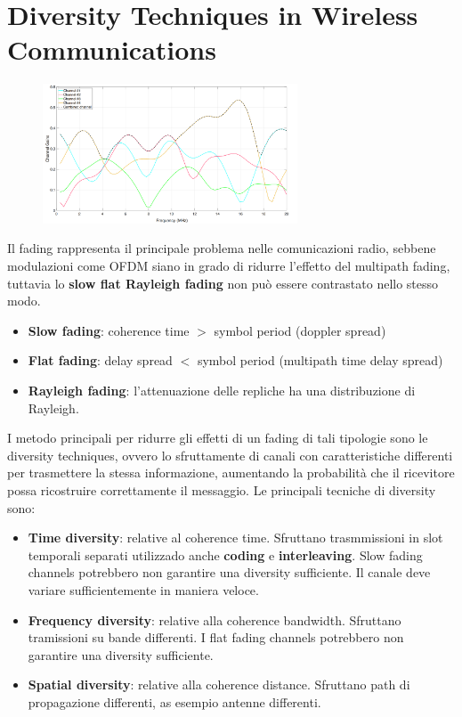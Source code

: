 \section*{Diversity Techniques in Wireless Communications}



\begin{figure}[ht]
    \centering
    \includegraphics[width=0.675\textwidth]{imgs/diversity_graph.jpg}
\end{figure}


Il fading rappresenta il principale problema nelle comunicazioni radio, sebbene modulazioni come OFDM siano in grado di ridurre l'effetto del multipath fading, tuttavia lo \textbf{slow flat Rayleigh fading} non può essere contrastato nello stesso modo.

\begin{itemize}
    \item \textbf{Slow fading}: coherence time $>$ symbol period (doppler spread)
    \item \textbf{Flat fading}: delay spread $<$ symbol period (multipath time delay spread)
    \item \textbf{Rayleigh fading}: l'attenuazione delle repliche ha una distribuzione di Rayleigh.
\end{itemize}

I metodo principali per ridurre gli effetti di un fading di tali tipologie sono le diversity techniques, ovvero lo sfruttamente di canali con caratteristiche differenti per trasmettere la stessa informazione, aumentando la probabilità che il ricevitore possa ricostruire correttamente il messaggio.
Le principali tecniche di diversity sono:
\begin{itemize}
    \item \textbf{Time diversity}: relative al coherence time. Sfruttano trasmmissioni in slot temporali separati utilizzado anche \textbf{coding} e \textbf{interleaving}. Slow fading channels potrebbero non garantire una diversity sufficiente. Il canale deve variare sufficientemente in maniera veloce.
    \item \textbf{Frequency diversity}: relative alla coherence bandwidth. Sfruttano tramissioni su bande differenti. I flat fading channels potrebbero non garantire una diversity sufficiente.
    \item \textbf{Spatial diversity}: relative alla coherence distance. Sfruttano path di propagazione differenti, as esempio antenne differenti.
\end{itemize}

